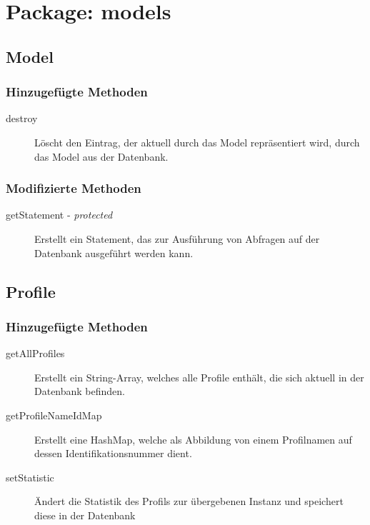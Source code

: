 \documentclass[parskip=full]{scrreprt}
\begin{document}
\section{Package: models}

\subsection{Model}

\subsubsection{Hinzugefügte Methoden}
\begin{description}
	\item[destroy] Löscht den Eintrag, der aktuell durch das Model repräsentiert wird, durch das Model aus der Datenbank.
\end{description}

\subsubsection{Modifizierte Methoden}
\begin{description}
	\item[getStatement - \textit{protected}] Erstellt ein Statement, das zur Ausführung von Abfragen auf der Datenbank ausgeführt werden kann.
\end{description}

\subsection{Profile}

\subsubsection{Hinzugefügte Methoden}
\begin{description}
	\item[getAllProfiles] Erstellt ein String-Array, welches alle Profile enthält, die sich aktuell in der Datenbank befinden.
	\item[getProfileNameIdMap] Erstellt eine HashMap, welche als Abbildung von einem Profilnamen auf dessen Identifikationsnummer dient.
	\item[setStatistic] Ändert die Statistik des Profils zur übergebenen Instanz und speichert diese in der Datenbank
	
\end{description}
\end{document}
